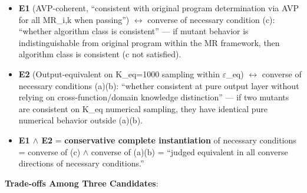 \documentclass[review,12pt,authoryear]{elsarticle}
\providecommand{\tightlist}{\setlength{\itemsep}{0pt}\setlength{\parskip}{0pt}}
\begin{document}
\begin{itemize}
\tightlist
\item
  \textbf{E1} (AVP-coherent, ``consistent with original program
  determination via AVP for all MR\_i,k when passing'') $\leftrightarrow$ converse of
  necessary condition (c): ``whether algorithm class is consistent'' ---
  if mutant behavior is indistinguishable from original program within
  the MR framework, then algorithm class is consistent (c not
  satisfied).
\item
  \textbf{E2} (Output-equivalent on K\_eq=1000 sampling within $\varepsilon$\_eq) $\leftrightarrow$
  converse of necessary conditions (a)(b): ``whether consistent at pure
  output layer without relying on cross-function/domain knowledge
  distinction'' --- if two mutants are consistent on K\_eq numerical
  sampling, they have identical pure numerical behavior outside (a)(b).
\item
  \textbf{E1 $\wedge$ E2} = \textbf{conservative complete instantiation} of
  necessary conditions = converse of (c) $\wedge$ converse of (a)(b) = ``judged
  equivalent in all converse directions of necessary conditions.''
\end{itemize}

\textbf{Trade-offs Among Three Candidates}:
\end{document}
